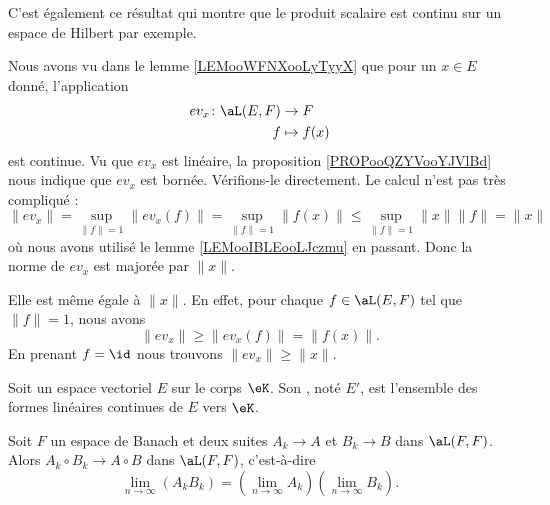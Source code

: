C'est également ce résultat qui montre que le produit scalaire est continu sur un espace de Hilbert par exemple.

\begin{example}     \label{EXooTQPEooRRdddt}
    Nous avons vu dans le lemme \ref{LEMooWFNXooLyTyyX} que pour un \( x\in E\) donné, l'application
    \begin{equation}
        \begin{aligned}
            ev_x\colon \aL(E,F)&\to F \\
            f&\mapsto f(x) 
        \end{aligned}
    \end{equation}
    est continue. Vu que \( ev_x\) est linéaire, la proposition \ref{PROPooQZYVooYJVlBd} nous indique que \( ev_x\) est bornée. Vérifions-le directement. Le calcul n'est pas très compliqué :
    \begin{equation}
        \| ev_x \|=\sup_{\| f \|=1}\| ev_x(f) \|=\sup_{\| f \|=1}\| f(x) \|\leq \sup_{\| f \|=1}\| x \|\| f \|=\| x \|
    \end{equation}
    où nous avons utilisé le lemme \ref{LEMooIBLEooLJczmu} en passant. Donc la norme de \( ev_x\) est majorée par \( \| x \|\).

    Elle est même égale à \( \| x \|\). En effet, pour chaque \( f\in \aL(E,F)\) tel que \(  \| f \|=1\), nous avons
    \begin{equation}
        \| ev_x \|\geq \| ev_x(f) \|=\| f(x) \|.
    \end{equation}
    En prenant \( f=\id\) nous trouvons \(  \| ev_x \|\geq \| x \|  \).
\end{example}

\begin{definition}      \label{DEFooKSDFooGIBtrG}
    Soit un espace vectoriel \( E\) sur le corps \( \eK\). Son , noté \( E'\), est l'ensemble des formes linéaires continues de \( E\) vers \( \eK\).
\end{definition}

\begin{lemma}   \label{LemWWXVSae}
Soit \( F\) un espace de Banach et deux suites \( A_k\to A\) et \( B_k\to B\) dans \( \aL(F,F)\). Alors \( A_k\circ B_k\to A\circ B\) dans \( \aL(F,F)\), c'est-à-dire
\begin{equation}
    \lim_{n\to \infty} (A_kB_k)=\left( \lim_{n\to \infty} A_k \right)\left( \lim_{n\to \infty} B_k \right).
\end{equation}
\end{lemma}

